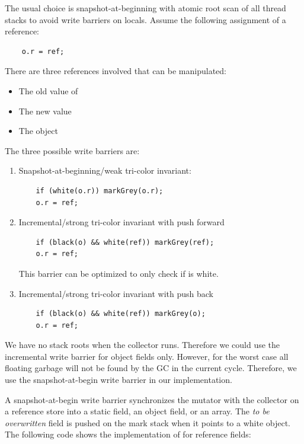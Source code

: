 The usual choice is snapshot-at-beginning with atomic root scan of
all thread stacks to avoid write barriers on locals. Assume the
following assignment of a reference:
\begin{lstlisting}
    o.r = ref;
\end{lstlisting}
There are three references involved that can be manipulated:
\begin{itemize}
    \item The old value of 
    \item The new value 
    \item The object 
\end{itemize}
The three possible write barriers are:
\begin{enumerate}
    \item
Snapshot-at-beginning/weak tri-color invariant:
\begin{lstlisting}
    if (white(o.r)) markGrey(o.r);
    o.r = ref;
\end{lstlisting}
    \item
Incremental/strong tri-color invariant with push forward
\begin{lstlisting}
    if (black(o) && white(ref)) markGrey(ref);
    o.r = ref;
\end{lstlisting}
This barrier can be optimized to only check if  is white.

    \item
Incremental/strong tri-color invariant with push back
\begin{lstlisting}
    if (black(o) && white(ref)) markGrey(o);
    o.r = ref;
\end{lstlisting}

\end{enumerate}

We have no stack roots when the collector runs. Therefore we could
use the incremental write barrier for object fields only. However,
for the worst case all floating garbage will not be found by the GC
in the current cycle. Therefore, we use the snapshot-at-begin write
barrier in our implementation.



A snapshot-at-begin write barrier synchronizes the mutator with the
collector on a reference store into a static field, an object field,
or an array. The \emph{to be overwritten} field is pushed on the
mark stack when it points to a white object. The following code
shows the implementation of  for reference fields:

